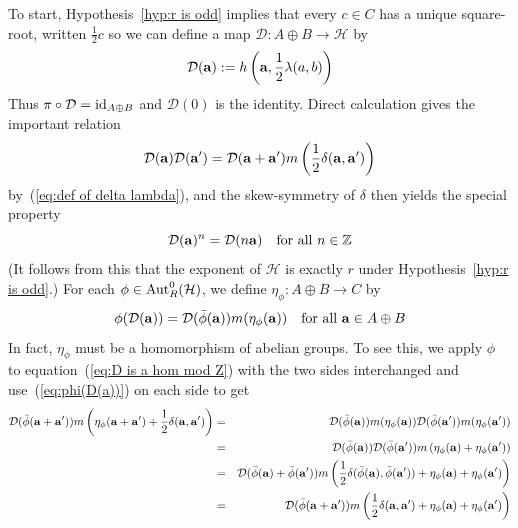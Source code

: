 \documentclass[12pt]{article}
\newcommand{\addwords}[1]{\ \ \ \mbox{#1}}
\newcommand{\Aut}{{\rm Aut}}
\newcommand{\ba}{\ensuremath{{\bf a}}}
\newcommand{\bbZ}{\ensuremath{\mathbb{Z}}}
\newcommand{\cD}{\ensuremath{\mathcal{D}}}
\newcommand{\cH}{\ensuremath{\mathcal{H}}}
\newcommand{\half}{\frac{1}{2}}
\newcommand{\id}{{\rm id}}
\newcommand{\AdsB}{\ensuremath{A\oplus B}}
\begin{document}
To start, Hypothesis~\ref{hyp:r is odd} implies that every $c\in C$ has a unique square-root, written $\frac12 c$ so we can define a map $\cD:A\oplus B \rightarrow\cH$ by
\begin{equation}\label{def:displacement operator}
	\cD(\ba):=h\left(\ba,\frac12\lambda(a,b)\right)
\end{equation}
Thus $\pi\circ \cD=\id_{\AdsB}$ and $\cD(0)$ is the identity. Direct calculation gives the important relation 
\begin{equation}\label{eq:D is a hom mod Z}
	\cD(\ba)\cD(\ba')=
	\cD(\ba+\ba')m\left(\half\delta(\ba,\ba')\right)
\end{equation}
by~(\ref{eq:def of delta lambda}), and the skew-symmetry of 
$\delta$ then yields the special property
\begin{equation}\label{eq:D commutes w powers}
\cD(\ba)^n = \cD(n\ba)\addwords{for all $n\in\bbZ$}
\end{equation}
(It follows from this that the exponent of $\cH$ is exactly $r$ under Hypothesis~\ref{hyp:r is odd}.) 
For each $\phi\in\Aut^0_R(\cH)$, we define $\eta_\phi:\AdsB\rightarrow C$ by 
\begin{equation}\label{eq:phi(D(a))}
	\phi(\cD(\ba))=\cD(\bar{\phi}(\ba))m(\eta_\phi(\ba))\addwords{for all $\ba\in\AdsB$}
\end{equation}
In fact, $\eta_\phi$ must be a homomorphism of abelian groups. To see this,  we apply $\phi$ to equation~(\ref{eq:D is a hom mod Z}) with the two sides interchanged and use~(\ref{eq:phi(D(a))}) on each side to get 
\begin{eqnarray*}
	\cD(\bar{\phi}(\ba+\ba'))m\left(\eta_\phi(\ba+\ba')+\half\delta(\ba,\ba')\right)&=&\cD(\bar{\phi}(\ba))m(\eta_\phi(\ba))
	\cD(\bar{\phi}(\ba'))m(\eta_\phi(\ba'))\\
	&=&\cD(\bar{\phi}(\ba))
	\cD(\bar{\phi}(\ba'))m\left(\eta_\phi(\ba)+\eta_\phi(\ba')\right)\\
	&=&\cD(\bar{\phi}(\ba)+\bar{\phi}(\ba'))
	m\left(\frac12 \delta(\bar{\phi}(\ba),\bar{\phi}(\ba'))+\eta_\phi(\ba)+\eta_\phi(\ba')\right)\\	
	&=&\cD(\bar{\phi}(\ba+\ba'))
	m\left(\frac12 \delta(\ba,\ba')+\eta_\phi(\ba)+\eta_\phi(\ba')\right)\\
\end{eqnarray*}
\end{document}
